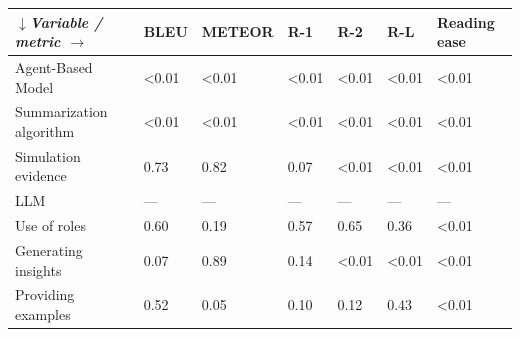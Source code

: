 \begin{tabular}{|l|l|l|l|l|l|l|}
\hline
\textit{$\downarrow$Variable / metric $\rightarrow$} & BLEU & METEOR & R-1 & R-2 & R-L & Reading ease \\
 \hline
 Agent-Based Model & \textless{}0.01 & \textless{}0.01 & \textless{}0.01 & \textless{}0.01 & \textless{}0.01 & \textless{}0.01 \\
 \hline
 Summarization algorithm & \textless{}0.01 & \textless{}0.01 & \textless{}0.01 & \textless{}0.01 & \textless{}0.01 & \textless{}0.01 \\
 \hline
 Simulation evidence & 0.73 & 0.82 & 0.07 & \textless{}0.01 & \textless{}0.01 & \textless{}0.01 \\
 \hline
 LLM & — & — & — & — & — & — \\
 \hline
 Use of roles & 0.60 & 0.19 & 0.57 & 0.65 & 0.36 & \textless{}0.01 \\
 \hline
 Generating insights & 0.07 & 0.89 & 0.14 & \textless{}0.01 & \textless{}0.01 & \textless{}0.01 \\
 \hline
 Providing examples & 0.52 & 0.05 & 0.10 & 0.12 & 0.43 & \textless{}0.01 \\
\hline
\end{tabular}
